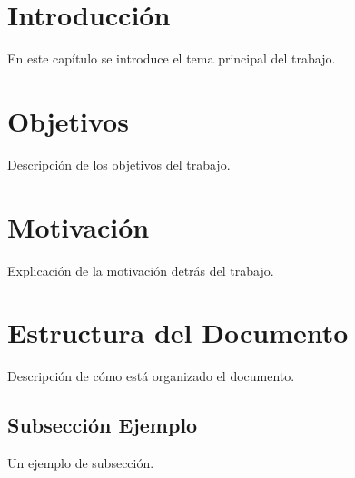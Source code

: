 \section{Introducción}
En este capítulo se introduce el tema principal del trabajo.

\section{Objetivos}
Descripción de los objetivos del trabajo.

\section{Motivación}
Explicación de la motivación detrás del trabajo.

\section{Estructura del Documento}
Descripción de cómo está organizado el documento.

\subsection{Subsección Ejemplo}
Un ejemplo de subsección.
